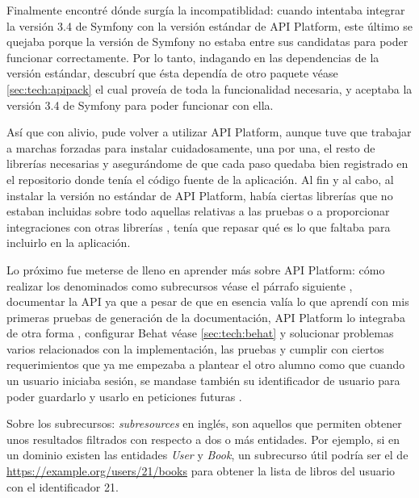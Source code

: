 Finalmente encontré dónde surgía la incompatiblidad: cuando intentaba integrar
la versión 3.4 de Symfony con la versión estándar de API Platform, este último
 se quejaba porque la versión de Symfony no
estaba entre sus candidatas para poder funcionar correctamente. Por lo tanto,
indagando en las dependencias de la versión estándar, descubrí que ésta
dependía de otro paquete \textemdash véase \ref{sec:tech:apipack} \textemdash el cual
proveía de toda la funcionalidad necesaria, y aceptaba la versión 3.4 de Symfony
para poder funcionar con ella.

Así que con alivio, pude volver a utilizar API Platform, aunque tuve que
trabajar a marchas forzadas para instalar cuidadosamente, una por una, el resto
de librerías necesarias y asegurándome de que cada paso quedaba bien registrado
en el repositorio donde tenía el código fuente de la aplicación. Al fin y al
cabo, al instalar la versión no estándar de API Platform, había ciertas librerías
que no estaban incluidas \textemdash sobre todo aquellas relativas a las pruebas
o a proporcionar integraciones con otras librerías \textemdash, tenía que repasar
qué es lo que faltaba para incluirlo en la aplicación.

Lo próximo fue meterse de lleno en aprender más sobre API Platform: cómo realizar
los denominados como subrecursos \textemdash véase el párrafo siguiente \textemdash, documentar la API \textemdash ya que a pesar de
que en esencia valía lo que aprendí con mis primeras pruebas de generación de
la documentación, API Platform lo integraba de otra forma \textemdash, configurar
Behat \textemdash véase \ref{sec:tech:behat} \textemdash y solucionar problemas
varios relacionados con la implementación, las pruebas y cumplir con ciertos
requerimientos que ya me empezaba a plantear el otro alumno \textemdash como que
cuando un usuario iniciaba sesión, se mandase también su identificador de usuario
para poder guardarlo y usarlo en peticiones futuras \textemdash.

Sobre los subrecursos: \textit{subresources} en inglés, son aquellos que permiten
obtener unos resultados filtrados con respecto a dos o más entidades. Por ejemplo, si
en un dominio existen las entidades \textit{User} y \textit{Book}, un
subrecurso útil podría ser el de \url{https://example.org/users/21/books} para
obtener la lista de libros del usuario con el identificador 21.

